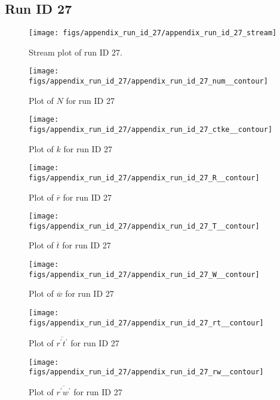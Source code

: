 \subsection{Run ID 27}
\begin{figure}[H]
\centering
\texttt{[image: figs/appendix\_run\_id\_27/appendix\_run\_id\_27\_stream]}
\caption{Stream plot of run ID 27.}
\label{fig:appendix_run_id_27_stream}
\end{figure}


\begin{figure}[H]
\centering
\texttt{[image: figs/appendix\_run\_id\_27/appendix\_run\_id\_27\_num\_\_contour]}
\caption{Plot of $N$ for run ID 27}
\label{fig:appendix_run_id_27_num__contour}
\end{figure}


\begin{figure}[H]
\centering
\texttt{[image: figs/appendix\_run\_id\_27/appendix\_run\_id\_27\_ctke\_\_contour]}
\caption{Plot of $k$ for run ID 27}
\label{fig:appendix_run_id_27_ctke__contour}
\end{figure}


\begin{figure}[H]
\centering
\texttt{[image: figs/appendix\_run\_id\_27/appendix\_run\_id\_27\_R\_\_contour]}
\caption{Plot of $\overline{r}$ for run ID 27}
\label{fig:appendix_run_id_27_R__contour}
\end{figure}


\begin{figure}[H]
\centering
\texttt{[image: figs/appendix\_run\_id\_27/appendix\_run\_id\_27\_T\_\_contour]}
\caption{Plot of $\overline{t}$ for run ID 27}
\label{fig:appendix_run_id_27_T__contour}
\end{figure}


\begin{figure}[H]
\centering
\texttt{[image: figs/appendix\_run\_id\_27/appendix\_run\_id\_27\_W\_\_contour]}
\caption{Plot of $\overline{w}$ for run ID 27}
\label{fig:appendix_run_id_27_W__contour}
\end{figure}


\begin{figure}[H]
\centering
\texttt{[image: figs/appendix\_run\_id\_27/appendix\_run\_id\_27\_rt\_\_contour]}
\caption{Plot of $\overline{r^\prime t^\prime}$ for run ID 27}
\label{fig:appendix_run_id_27_rt__contour}
\end{figure}


\begin{figure}[H]
\centering
\texttt{[image: figs/appendix\_run\_id\_27/appendix\_run\_id\_27\_rw\_\_contour]}
\caption{Plot of $\overline{r^\prime w^\prime}$ for run ID 27}
\label{fig:appendix_run_id_27_rw__contour}
\end{figure}


